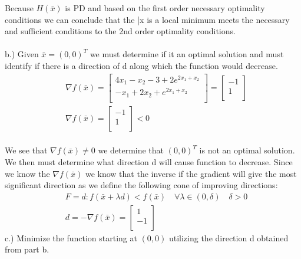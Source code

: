\documentclass[12pt]{article}
\begin{document}
Because $H(\bar x)$ is PD and based on the first order necessary optimality conditions we can conclude that the \bar x is a local minimum meets the necessary and sufficient conditions to the 2nd order optimality conditions.\\ \\
b.) Given $\bar x = (0,0)^T$ we must determine if it an optimal solution and must identify if there is a direction of d along which the function would decrease.\\
    \begin{align*}
        &\nabla f(\bar x) = 
        \begin{bmatrix}
            4x_1 -x_2 -3 + 2 e^{2x_1 + x_2}\\
            -x_1 + 2x_2 + e^{2x_1 + x_2}\\
        \end{bmatrix} 
        = 
        \begin{bmatrix}
            -1\\
            1\\
        \end{bmatrix}\\
        &\nabla f(\bar x) = 
        \begin{bmatrix}
            -1\\
            1\\
        \end{bmatrix} < 0
    \end{align*}\\
We see that $\nabla f(\bar x) \neq 0$ we determine that $(0,0)^T$ is not an optimal solution. We then must determine what direction d will cause function to decrease. Since we know the $\nabla f(\bar x)$ we know that the inverse if the gradient will give the most significant direction as we define the following cone of improving directions: \\ 
    \begin{align*}
        &F = d: f(\bar x + \lambda d) < f(\bar x) \quad \forall \lambda \in (0, \delta) \quad \delta > 0\\
        &d = -\nabla f(\bar x) = 
        \begin{bmatrix}
            1\\
            -1\\
        \end{bmatrix}
    \end{align*}
c.)  Minimize the function starting at $(0,0)$ utilizing the direction d obtained from part b.\\
\end{document}
